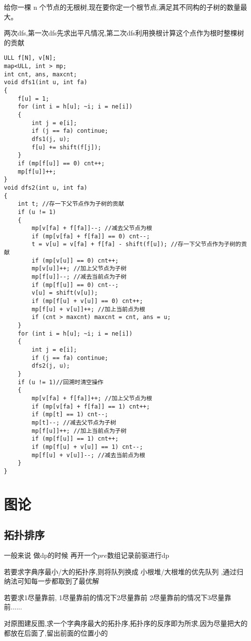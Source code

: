 \documentclass[a4paper, fontset=none]{ctexart}
\begin{document}
给你一棵 n 个节点的无根树,现在要你定一个根节点,满足其不同构的子树的数量最大。

两次dfs,第一次dfs先求出平凡情况,第二次dfs利用换根计算这个点作为根时整棵树的贡献

\begin{verbatim}
ULL f[N], v[N];
map<ULL, int > mp;
int cnt, ans, maxcnt;
void dfs1(int u, int fa)
{
    f[u] = 1;
    for (int i = h[u]; ~i; i = ne[i])
    {
        int j = e[i];
        if (j == fa) continue;
        dfs1(j, u);
        f[u] += shift(f[j]);
    }
    if (mp[f[u]] == 0) cnt++;
    mp[f[u]]++;
}
void dfs2(int u, int fa)
{
    int t; //存一下父节点作为子树的贡献
    if (u != 1)
    {
        mp[v[fa] + f[fa]]--; //减去父节点为根
        if (mp[v[fa] + f[fa]] == 0) cnt--;
        t = v[u] = v[fa] + f[fa] - shift(f[u]); //存一下父节点作为子树的贡献
        if (mp[v[u]] == 0) cnt++;
        mp[v[u]]++; //加上父节点为子树
        mp[f[u]]--; //减去当前点为子树
        if (mp[f[u]] == 0) cnt--;
        v[u] = shift(v[u]);
        if (mp[f[u] + v[u]] == 0) cnt++;
        mp[f[u] + v[u]]++; //加上当前点为根
        if (cnt > maxcnt) maxcnt = cnt, ans = u;
    }
    for (int i = h[u]; ~i; i = ne[i])
    {
        int j = e[i];
        if (j == fa) continue;
        dfs2(j, u);
    }
    if (u != 1)//回溯时清空操作
    {
        mp[v[fa] + f[fa]]++; //加上父节点为根
        if (mp[v[fa] + f[fa]] == 1) cnt++;
        if (mp[t] == 1) cnt--;
        mp[t]--; //减去父节点为子树
        mp[f[u]]++; //加上当前点为子树
        if (mp[f[u]] == 1) cnt++;
        if (mp[f[u] + v[u]] == 1) cnt--;
        mp[f[u] + v[u]]--; //减去当前点为根
    }
}
\end{verbatim}

\section{图论}
\subsection{拓扑排序}
一般来说 做dp的时候 再开一个$pre$数组记录前驱进行dp

若要求字典序最小/大的拓扑序,则将队列换成 小根堆/大根堆的优先队列 ,通过归纳法可知每一步都取到了最优解

若要求1尽量靠前, 1尽量靠前的情况下2尽量靠前  2尽量靠前的情况下3尽量靠前......

对原图建反图,求一个字典序最大的拓扑序,拓扑序的反序即为所求,因为尽量把大的都放在后面了,留出前面的位置小的
\end{document}
